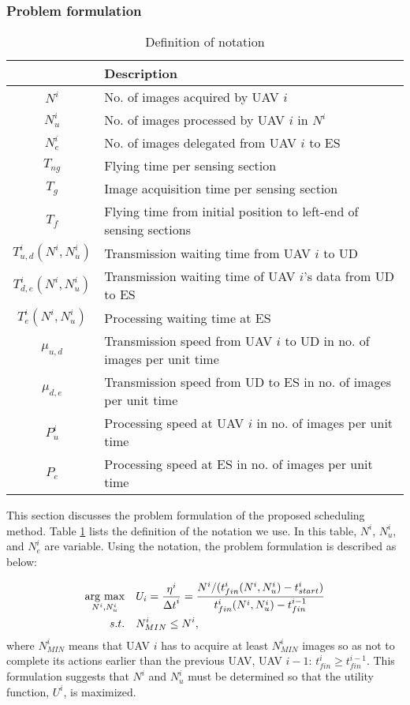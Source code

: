\documentclass{ieeeaccess}
\newcommand{\argmax}{\mathop{\rm arg~max}\limits}
\begin{document}
\subsubsection{Problem formulation}

\begin{table}[t]
\centering
\caption{Definition of notation}
  \begin{tabular}{|c|p{6cm}|} \hline
 & Description
 \\ \hline
 $N^i$ & No. of images acquired by UAV $i$ \\ \hline
 $N_u^i$ & No. of images processed by UAV $i$ in $N^i$ \\ \hline
 $N_e^i$ & No. of images delegated from UAV $i$ to ES   \\ \hline
 $T_{ng}$ & Flying time per sensing section  \\ \hline
 $T_g$ & Image acquisition time per sensing section \\ \hline
 $T_f$ & Flying time from initial position to left-end of sensing sections \\ \hline
 $T_{u,d}^{i}(N^i,N_u^i)$ & Transmission waiting time from UAV $i$ to UD  \\ \hline
 $T_{d,e}^{i}(N^i,N_u^i)$ & Transmission waiting time of UAV $i$'s data from UD to ES  \\ \hline
 $T_e^{i}(N^i,N_u^i)$ & Processing waiting time at ES  \\ \hline
 $\mu_{u,d}$ & Transmission speed from UAV $i$ to UD in no. of images per unit time \\ \hline
 $\mu_{d,e}$ & Transmission speed from UD to ES in no. of images per unit time \\ \hline
 $P_u^i$ & Processing speed at UAV $i$ in no. of images per unit time \\ \hline
 $P_e$ &  Processing speed at ES in no. of images per unit time \\ \hline
\end{tabular}
\label{para}
\end{table}

This section discusses the problem formulation of the proposed scheduling method.
%
Table \ref{para} lists the definition of the notation we use.
%
In this table, $N^i$, $N_u^i$, and $N_e^i$ are variable.
%
Using the notation, the problem formulation is described as below:

\begin{align}
\argmax_{N^i,N_u^i} \quad&  U_i =\frac{\eta^{i}}{{\Delta{t}}^i}  = \frac{N^i / (t_{fin}^i(N^i,N_u^i)-t_{start}^i)}{t_{fin}^i(N^i,N_u^i)-t_{fin}^{i-1}}\label{eq1}\\
s.t. \quad& {N_{MIN}^i}\leq{N^i}, \label{eq2}
\end{align}
where $N_{MIN}^i$ means that UAV $i$ has to acquire at least $N_{MIN}^i$ images so as not to complete its actions earlier than the previous UAV, UAV $i-1$: ${t_{fin}^i}\geq{t_{fin}^{i-1}}$.
This formulation suggests that $N^i$ and $N_u^i$ must be determined so that the utility function, $U^i$, is maximized.
\end{document}
